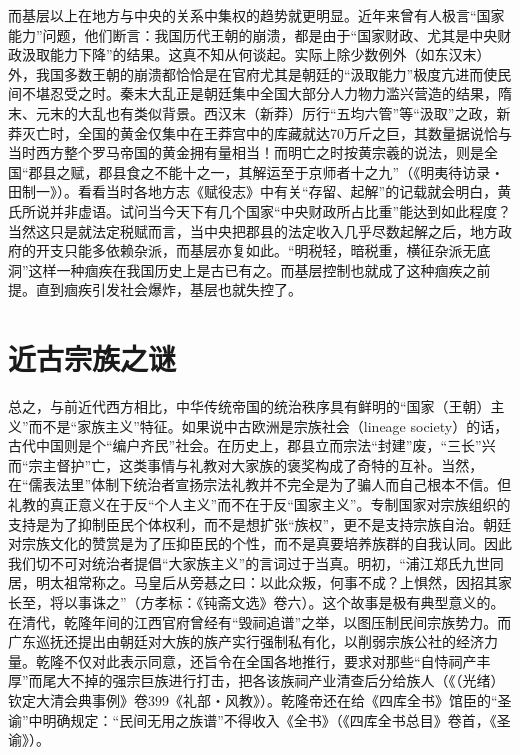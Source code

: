 \documentclass[a4paper,12pt,punct=kaiming,fontset=none]{ctexart}
\begin{document}
而基层以上在地方与中央的关系中集权的趋势就更明显。近年来曾有人极言“国家能力”问题，他们断言：我国历代王朝的崩溃，都是由于“国家财政、尤其是中央财政汲取能力下降”的结果。这真不知从何谈起。实际上除少数例外（如东汉末）外，我国多数王朝的崩溃都恰恰是在官府尤其是朝廷的“汲取能力”极度亢进而使民间不堪忍受之时。秦末大乱正是朝廷集中全国大部分人力物力滥兴营造的结果，隋末、元末的大乱也有类似背景。西汉末（新莽）厉行“五均六管”等“汲取”之政，新莽灭亡时，全国的黄金仅集中在王莽宫中的库藏就达70万斤之巨，其数量据说恰与当时西方整个罗马帝国的黄金拥有量相当！而明亡之时按黄宗羲的说法，则是全国“郡县之赋，郡县食之不能十之一，其解运至于京师者十之九”（《明夷待访录・田制一》）。看看当时各地方志《赋役志》中有关“存留、起解”的记载就会明白，黄氏所说并非虚语。试问当今天下有几个国家“中央财政所占比重”能达到如此程度？当然这只是就法定税赋而言，当中央把郡县的法定收入几乎尽数起解之后，地方政府的开支只能多依赖杂派，而基层亦复如此。“明税轻，暗税重，横征杂派无底洞”这样一种痼疾在我国历史上是古已有之。而基层控制也就成了这种痼疾之前提。直到痼疾引发社会爆炸，基层也就失控了。

\section*{近古宗族之谜}

总之，与前近代西方相比，中华传统帝国的统治秩序具有鲜明的“国家（王朝）主义”而不是“家族主义”特征。如果说中古欧洲是宗族社会（lineage society）的话，古代中国则是个“编户齐民”社会。在历史上，郡县立而宗法“封建”废，“三长”兴而“宗主督护”亡，这类事情与礼教对大家族的褒奖构成了奇特的互补。当然，在“儒表法里”体制下统治者宣扬宗法礼教并不完全是为了骗人而自己根本不信。但礼教的真正意义在于反“个人主义”而不在于反“国家主义”。专制国家对宗族组织的支持是为了抑制臣民个体权利，而不是想扩张“族权”，更不是支持宗族自治。朝廷对宗族文化的赞赏是为了压抑臣民的个性，而不是真要培养族群的自我认同。因此我们切不可对统治者提倡“大家族主义”的言词过于当真。明初，“浦江郑氏九世同居，明太祖常称之。马皇后从旁惎之曰：以此众叛，何事不成？上惧然，因招其家长至，将以事诛之”（方孝标：《钝斋文选》卷六）。这个故事是极有典型意义的。在清代，乾隆年间的江西官府曾经有“毁祠追谱”之举，以图压制民间宗族势力。而广东巡抚还提出由朝廷对大族的族产实行强制私有化，以削弱宗族公社的经济力量。乾隆不仅对此表示同意，还旨令在全国各地推行，要求对那些“自恃祠产丰厚”而尾大不掉的强宗巨族进行打击，把各该族祠产业清查后分给族人（《（光绪）钦定大清会典事例》卷399《礼部・风教》）。乾隆帝还在给《四库全书》馆臣的“圣谕”中明确规定：“民间无用之族谱”不得收入《全书》（《四库全书总目》卷首，《圣谕》）。
\end{document}
